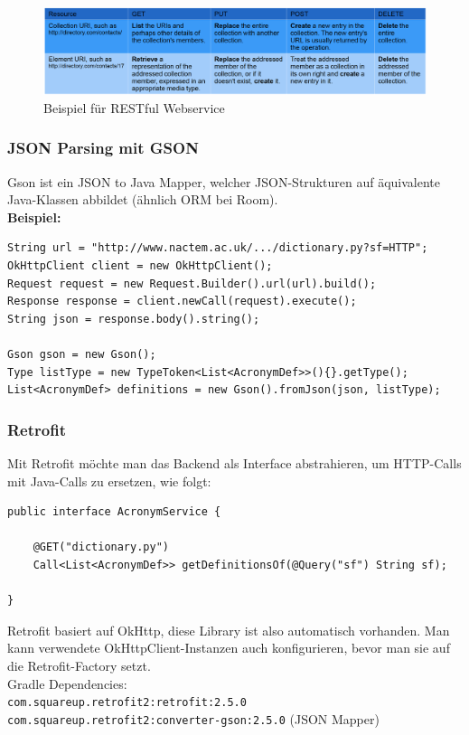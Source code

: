 \documentclass[a4paper]{article}
\begin{document}
	\begin{figure}[!htb]
		\centering
		\includegraphics[width=\textwidth]{img/restful_exmp.png}
		\caption{Beispiel für RESTful Webservice}
		\label{fig:restful_example}
	\end{figure}
		
	\subsubsection{JSON Parsing mit GSON}
	
	Gson ist ein JSON to Java Mapper, welcher JSON-Strukturen auf äquivalente Java-Klassen abbildet (ähnlich ORM bei Room).\\
	\textbf{Beispiel:}
	
	\begin{lstlisting}
String url = "http://www.nactem.ac.uk/.../dictionary.py?sf=HTTP"; 
OkHttpClient client = new OkHttpClient();
Request request = new Request.Builder().url(url).build(); 
Response response = client.newCall(request).execute(); 
String json = response.body().string(); 

Gson gson = new Gson(); 
Type listType = new TypeToken<List<AcronymDef>>(){}.getType(); 
List<AcronymDef> definitions = new Gson().fromJson(json, listType);
	\end{lstlisting}
	
	\subsubsection{Retrofit}
	
	Mit Retrofit möchte man das Backend als Interface abstrahieren, um HTTP-Calls mit Java-Calls zu ersetzen, wie folgt:
	
	\begin{lstlisting}
public interface AcronymService {

	@GET("dictionary.py")
	Call<List<AcronymDef>> getDefinitionsOf(@Query("sf") String sf);
	
}
	\end{lstlisting}
	\noindent
	Retrofit basiert auf OkHttp, diese Library ist also automatisch vorhanden.
	Man kann verwendete OkHttpClient-Instanzen auch konfigurieren, bevor man sie auf die Retrofit-Factory setzt.\\
	Gradle Dependencies:\\
	\texttt{com.squareup.retrofit2:retrofit:2.5.0}\\
	\texttt{com.squareup.retrofit2:converter-gson:2.5.0} (JSON Mapper)
	
\end{document}
